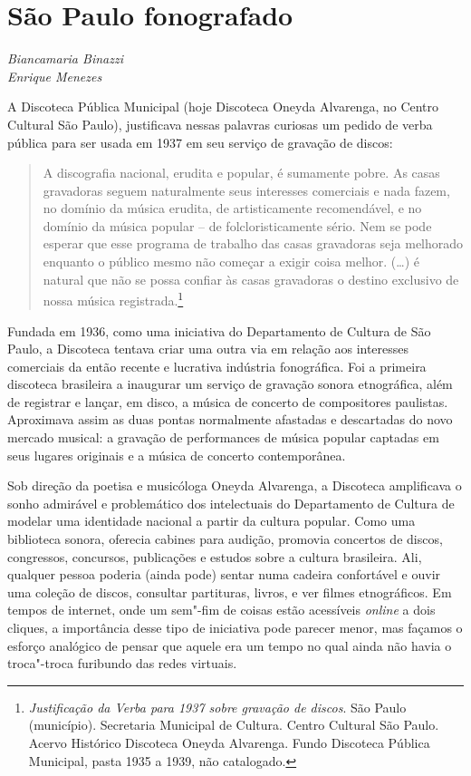 \chapter*{São Paulo fonografado}

\begin{flushright}
\emph{Biancamaria Binazzi\\ Enrique Menezes}
\end{flushright}

A Discoteca Pública Municipal (hoje Discoteca Oneyda Alvarenga, no
Centro Cultural São Paulo), justificava nessas palavras curiosas um
pedido de verba pública para ser usada em 1937 em seu serviço de
gravação de discos:

\begin{quote}
A discografia nacional, erudita e popular, é sumamente pobre. As casas
gravadoras seguem naturalmente seus interesses comerciais e nada fazem,
no domínio da música erudita, de artisticamente recomendável, e no
domínio da música popular -- de folcloristicamente sério. Nem se pode
esperar que esse programa de trabalho das casas gravadoras seja
melhorado enquanto o público mesmo não começar a exigir coisa melhor.
(\ldots{}) é natural que não se possa confiar às casas gravadoras o destino
exclusivo de nossa música registrada.\footnote{\emph{Justificação da
  Verba para 1937 sobre gravação de discos}. São Paulo (município).
  Secretaria Municipal de Cultura. Centro Cultural São Paulo. Acervo
  Histórico Discoteca Oneyda Alvarenga. Fundo Discoteca Pública
  Municipal, pasta 1935 a 1939, não catalogado.}
\end{quote}

Fundada em 1936, como uma iniciativa do Departamento de Cultura de São
Paulo, a Discoteca tentava criar uma outra via em relação aos interesses
comerciais da então recente e lucrativa indústria fonográfica. Foi a
primeira discoteca brasileira a inaugurar um serviço de gravação sonora
etnográfica, além de registrar e lançar, em disco, a música de concerto
de compositores paulistas. Aproximava assim as duas pontas normalmente
afastadas e descartadas do novo mercado musical: a gravação de
performances de música popular captadas em seus lugares originais e a
música de concerto contemporânea.

Sob direção da poetisa e musicóloga Oneyda Alvarenga, a Discoteca
amplificava o sonho admirável e problemático dos intelectuais do
Departamento de Cultura de modelar uma identidade nacional a partir da
cultura popular. Como uma biblioteca sonora, oferecia cabines para
audição, promovia concertos de discos, congressos, concursos,
publicações e estudos sobre a cultura brasileira. Ali, qualquer pessoa
poderia (ainda pode) sentar numa cadeira confortável e ouvir uma coleção
de discos, consultar partituras, livros, e ver filmes etnográficos. Em
tempos de internet, onde um sem"-fim de coisas estão acessíveis
\emph{online} a dois cliques, a importância desse tipo de iniciativa
pode parecer menor, mas façamos o esforço analógico de pensar que aquele
era um tempo no qual ainda não havia o troca"-troca furibundo das redes
virtuais.

